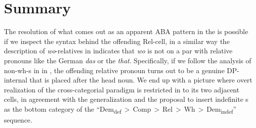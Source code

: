 \section{Summary}

The resolution of what comes out as an apparent ABA pattern  in the   is possible if we inspect the syntax behind the offending Rel-cell, in a similar way the description of \textit{wo}-relatives in  indicates that \textit{wo} is not on a par with relative pronouns like the German \textit{das} or the  \textit{that}. Specifically, if we follow the analysis of non-wh-s in  in \cite{Jenks-etall}, the offending relative pronoun turns out to be a genuine DP-internal  that is placed after the head noun. We end up with a picture where overt realization of the cross-categorial paradigm is restricted in  to its two adjacent cells, in agreement with the  generalization and the proposal to insert indefinite s as the bottom category of the ``Dem\textsubscript{def}\,$>$\,Comp\,$>$\,Rel\,$>$\,Wh\,$>$\,Dem\textsubscript{indef}'' sequence.




